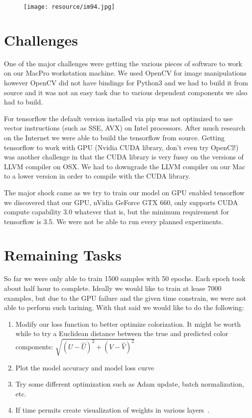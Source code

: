 \documentclass[12pt]{article}
\begin{document}
\begin{figure}[H]
 \centering
 \texttt{[image: resource/im94.jpg]}
\end{figure}


\section{Challenges}
One of the major challenges were getting the various pieces of software to work on our MacPro workstation machine. We used OpenCV for image manipulations however OpenCV did not have bindings for Python3 and we had to build it from source and it was not an easy task due to various dependent components we also had to build. 

For tensorflow the default version installed via pip was not optimized to use vector instructions (such as SSE, AVX) on Intel processors. After much research on the Internet we were able to build the tensorflow from source. Getting tensorflow to work with GPU (Nvidia CUDA library, don't even try OpenCl!) was another challenge in that the CUDA library is very fussy on the versions of LLVM compiler on OSX. We had to downgrade the LLVM compiler on our Mac to a lower version in order to compile with the CUDA library. 

The major shock came as we try to train our model on GPU enabled tensorflow we discovered that our GPU, nVidia GeForce GTX 660, only supports CUDA compute capability 3.0 whatever that is, but the minimum requirement for tensorflow is 3.5. We were not be able to run every planned experiments. 


\section{Remaining Tasks}
So far we were only able to train 1500 samples with 50 epochs. Each epoch took about half hour to complete. Ideally we would like to train at lease 7000 examples, but due to the GPU failure and the given time constrain, we were not able to perform such tarining. With that said we would like to do the following:

\begin{enumerate}[label=(\roman*)]
\item Modify our loss function to better optimize colorization. It might be worth while to try a Euclidean distance between the true and predicted color components: $\sqrt{(U-\hat{U})^2+(V-\hat{V})^2}$
\item Plot the model accuracy and model loss curve
\item Try some different optimization such as Adam update, batch normalization, etc. 
\item If time permits create visualization of weights in various layers~\cite{VISW}.
\end{enumerate}



\end{document}
